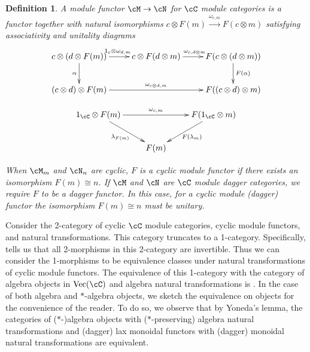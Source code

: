 \documentclass[11pt,reqno]{amsart}
\DeclareMathOperator{\Vect}{Vec}
\numberwithin{equation}{section}
\theoremstyle{plain}
\newtheorem{defn}[thm]{Definition}
\begin{document}
\begin{defn} A module functor $\cM \to \cN$ for $\cC$ module categories is a functor together with natural isomorphisms $c \otimes F(m) \stackrel{\omega_{c, m}}{\to} F(c \otimes m)$ satisfying associativity and unitality diagrams
$$\xymatrix{c \otimes (d \otimes F(m)) \ar[r]^{1_c \otimes \omega_{d, m}} \ar[d]_\alpha & c \otimes F(d \otimes m) \ar[r]^{\omega_{c, d \otimes m}} & F(c \otimes (d \otimes m)) \ar[d]^{F(\alpha)} \\ (c \otimes d) \otimes F(m) \ar[rr]^{\omega_{c \otimes d, m}} & & F((c \otimes d) \otimes m) }$$

$$\xymatrix{1_{\cC} \otimes F(m) \ar[rr]^{\omega_{c, m}} \ar[dr]_{\lambda_{F(m)}} && F(1_{\cC} \otimes m) \ar[dl]^{F(\lambda_m)} \\ & F(m)}$$

When $\cM_m$ and $\cN_n$ are cyclic, $F$ is a \emph{cyclic} module functor if there exists an isomorphism $F(m) \cong n$.
If $\cM$ and $\cN$ are $\cC$ module dagger categories, we require $F$ to be a dagger functor.
In this case, for a cyclic module (dagger) functor the isomorphism $F(m) \cong n$ must be unitary.
\end{defn}

Consider the 2-category of cyclic $\cC$ module categories, cyclic module functors, and natural transformations.
This category truncates to a 1-category.
Specifically, \cite[Lemma~3.6]{HPT23b} tells us that all 2-morphisms in this 2-category are invertible.
Thus we can consider the 1-morphisms to be equivalence classes under natural transformations of cyclic module functors.
The equivalence of this 1-category with the category of algebra objects in $\Vect(\cC)$ and algebra natural transformations is \cite[Remark~9]{Ost03}.
In the case of both algebra and $*$-algebra objects, we sketch the equivalence on objects for the convenience of the reader.
To do so, we observe that by Yoneda's lemma, the categories of ($*$-)algebra objects with ($*$-preserving) algebra natural transformations and (dagger) lax monoidal functors with (dagger) monoidal natural transformations are equivalent.
\end{document}
